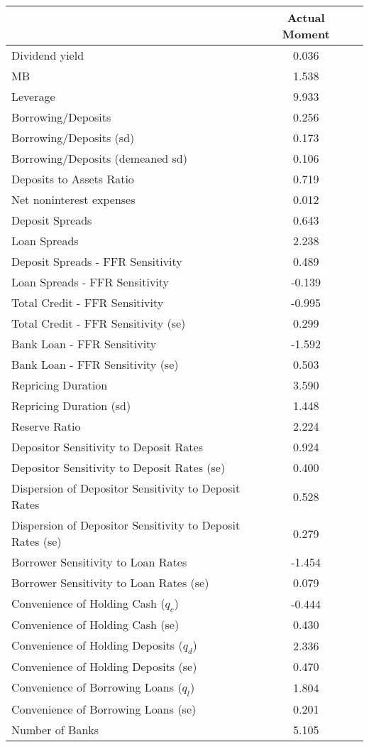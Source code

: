 \begin{tabular*}{\hsize}{@{\hskip\tabcolsep\extracolsep\fill}l*{2}{c}}\hline \hline & {Actual Moment}  &    \\ [1ex] \hline  Dividend yield&0.036&\\
MB&1.538&\\
Leverage&9.933&\\
Borrowing/Deposits&0.256&\\
Borrowing/Deposits (sd)&0.173&\\
Borrowing/Deposits (demeaned sd)&0.106&\\
Deposits to Assets Ratio&0.719&\\
Net noninterest expenses&0.012&\\
Deposit Spreads&0.643&\\
Loan Spreads&2.238&\\
Deposit Spreads - FFR Sensitivity&0.489&\\
Loan Spreads - FFR Sensitivity&-0.139&\\
Total Credit - FFR Sensitivity&-0.995&\\
Total Credit - FFR Sensitivity (se)&0.299&\\
Bank Loan - FFR Sensitivity&-1.592&\\
Bank Loan - FFR Sensitivity (se)&0.503&\\
Repricing Duration&3.590&\\
Repricing Duration (sd)&1.448&\\
Reserve Ratio&2.224&\\
Depositor Sensitivity to Deposit Rates&0.924&\\
Depositor Sensitivity to Deposit Rates (se)&0.400&\\
Dispersion of Depositor Sensitivity to Deposit Rates&0.528&\\
Dispersion of Depositor Sensitivity to Deposit Rates (se)&0.279&\\
Borrower Sensitivity to Loan Rates&-1.454&\\
Borrower Sensitivity to Loan Rates (se)&0.079&\\
Convenience of Holding Cash ($q_c$)&-0.444&\\
Convenience of Holding Cash (se)&0.430&\\
Convenience of Holding Deposits ($q_d$)&2.336&\\
Convenience of Holding Deposits (se)&0.470&\\
Convenience of Borrowing Loans ($q_l$)&1.804&\\
Convenience of Borrowing Loans (se)&0.201&\\
Number of Banks&5.105&\\
\hline \hline \end{tabular*}
